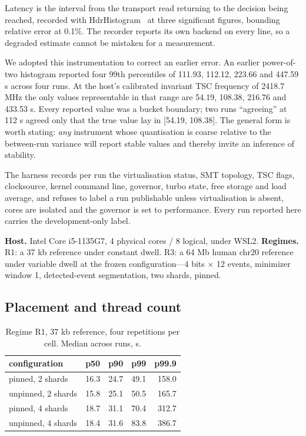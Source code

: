 \documentclass[conference]{IEEEtran}
\begin{document}
Latency is the interval from the transport read returning to the decision being reached,
recorded with HdrHistogram~\cite{hdrhistogram} at three significant figures, bounding relative
error at 0.1\%. The recorder reports its own backend on every line, so a degraded estimate
cannot be mistaken for a measurement.

We adopted this instrumentation to correct an earlier error. An earlier power-of-two histogram reported four 99th
percentiles of 111.93, 112.12, 223.66 and 447.59 \textmu{}s across four runs. At the host's calibrated
invariant TSC frequency of 2418.7 MHz the only values representable in that range are 54.19,
108.38, 216.76 and 433.53 \textmu{}s. Every reported value was a bucket boundary; two runs ``agreeing''
at 112 \textmu{}s agreed only that the true value lay in [54.19, 108.38]. The general form is worth
stating: \emph{any} instrument whose quantisation is coarse relative to the between-run
variance will report stable values and thereby invite an inference of stability.

The harness records per run the virtualisation status, SMT topology, TSC flags, clocksource,
kernel command line, governor, turbo state, free storage and load average, and refuses to label
a run publishable unless virtualisation is absent, cores are isolated and the governor is set to
performance. Every run reported here carries the development-only label.

\textbf{Host.} Intel Core i5-1135G7, 4 physical cores / 8 logical, under WSL2.
\textbf{Regimes.} R1: a 37 kb reference under constant dwell. R3: a 64 Mb human chr20 reference
under variable dwell at the frozen configuration---4 bits $\times$ 12 events,
minimizer~\cite{minimizers} window
1, detected-event segmentation, two shards, pinned.

\subsection{Placement and thread count}

\begin{table}[t]
\caption{Regime R1, 37 kb reference, four repetitions per cell. Median across runs, \textmu{}s.}
\label{tab:r1}
\centering
\footnotesize
\begin{tabular}{lrrrr}
\toprule
configuration & p50 & p90 & p99 & p99.9 \\
\midrule
pinned, 2 shards   & 16.3 & 24.7 & 49.1 & 158.0 \\
unpinned, 2 shards & 15.8 & 25.1 & 50.5 & 165.7 \\
pinned, 4 shards   & 18.7 & 31.1 & 70.4 & 312.7 \\
unpinned, 4 shards & 18.4 & 31.6 & 83.8 & 386.7 \\
\bottomrule
\end{tabular}
\end{table}
\end{document}
